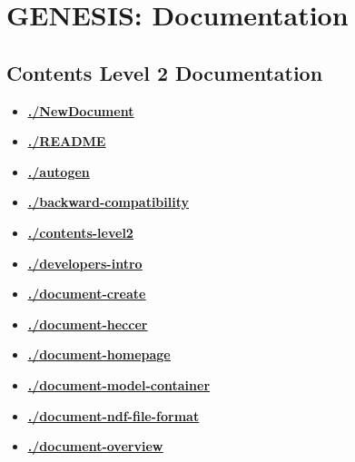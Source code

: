 \documentclass[12pt]{article}
\begin{document}
\section*{GENESIS: Documentation}

\subsection*{Contents Level 2 Documentation}

\begin{itemize}

\item \href{.././NewDocument/./NewDocument.pdf}{\bf \underline{./NewDocument}}

\item \href{.././README/./README.pdf}{\bf \underline{./README}}

\item \href{.././autogen/./autogen.pdf}{\bf \underline{./autogen}}

\item \href{.././backward-compatibility/./backward-compatibility.pdf}{\bf \underline{./backward-compatibility}}

\item \href{.././contents-level2/./contents-level2.pdf}{\bf \underline{./contents-level2}}

\item \href{.././developers-intro/./developers-intro.pdf}{\bf \underline{./developers-intro}}

\item \href{.././document-create/./document-create.pdf}{\bf \underline{./document-create}}

\item \href{.././document-heccer/./document-heccer.pdf}{\bf \underline{./document-heccer}}

\item \href{.././document-homepage/./document-homepage.pdf}{\bf \underline{./document-homepage}}

\item \href{.././document-model-container/./document-model-container.pdf}{\bf \underline{./document-model-container}}

\item \href{.././document-ndf-file-format/./document-ndf-file-format.pdf}{\bf \underline{./document-ndf-file-format}}

\item \href{.././document-overview/./document-overview.pdf}{\bf \underline{./document-overview}}


\end{itemize}
\end{document}
